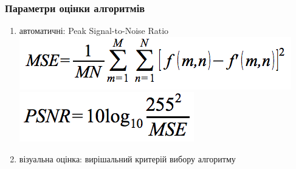 \documentclass[12pt]{beamer}
\begin{document}
\begin{frame}\frametitle{Параметри оцінки алгоритмів}
	\begin{enumerate}
		\item автоматичні: Peak Signal-to-Noise Ratio \linebreak
		\includegraphics[scale=0.4]{images/mse} \linebreak
		\includegraphics[scale=0.4]{images/psnr} \linebreak
		\item візуальна оцінка: вирішальний критерій вибору алгоритму
	\end{enumerate}
\end{frame}
\end{document}
